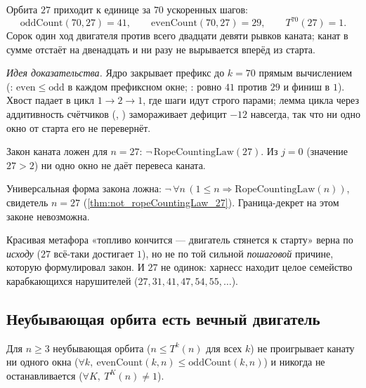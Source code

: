 \begin{theorem}\label{thm:counts_at_70_at_27}
Орбита $27$ приходит к единице за $70$ ускоренных шагов:
\begin{equation}\label{eq:counts-27}
\mathrm{oddCount}(70,27)=41,\qquad \mathrm{evenCount}(70,27)=29,\qquad T^{70}(27)=1.
\end{equation}
Сорок один ход двигателя против всего двадцати девяти рывков каната; канат в сумме отстаёт на
двенадцать и ни разу не вырывается вперёд из старта. \green{}
\end{theorem}

\emph{Идея доказательства.} Ядро закрывает префикс до $k=70$ прямым вычислением
(: $\mathrm{even}\le\mathrm{odd}$ в каждом префиксном окне;
: ровно $41$ против $29$ и финиш в $1$). Хвост падает в цикл
$1\to 2\to 1$, где шаги идут строго парами; лемма цикла  через аддитивность
счётчиков (, ) замораживает дефицит $-12$ навсегда, так что ни
одно окно от старта его не перевернёт.

\begin{theorem}\label{thm:not_ropeCountingLaw_27}
Закон каната ложен для $n=27$: $\neg\,\mathrm{RopeCountingLaw}(27)$. Из $j=0$ (значение $27>2$) ни одно
окно не даёт перевеса каната. \green{}
\end{theorem}

\begin{theorem}\label{thm:ropeLaw_universal_refuted}
Универсальная форма закона ложна: $\neg\,\forall n\,(1\le n\Rightarrow\mathrm{RopeCountingLaw}(n))$,
свидетель $n=27$ (\cref{thm:not_ropeCountingLaw_27}). Граница-декрет на этом законе невозможна. \green{}
\end{theorem}

Красивая метафора «топливо кончится --- двигатель стянется к старту» верна по \emph{исходу} ($27$
всё-таки достигает $1$), но не по той сильной \emph{пошаговой} причине, которую формулировал закон. И
$27$ не одинок: харнесс находит целое семейство карабкающихся нарушителей ($27,31,41,47,54,55,\dots$).

\subsection{Неубывающая орбита есть вечный двигатель}

\begin{theorem}\label{thm:nonDescendingOrbit_is_perpetual_engine}
Для $n\ge 3$ неубывающая орбита ($n\le T^{k}(n)$ для всех $k$) не проигрывает канату ни одного окна
($\forall k,\ \mathrm{evenCount}(k,n)\le\mathrm{oddCount}(k,n)$) и никогда не останавливается
($\forall K,\ T^{K}(n)\neq 1$). \green{}
\end{theorem}

